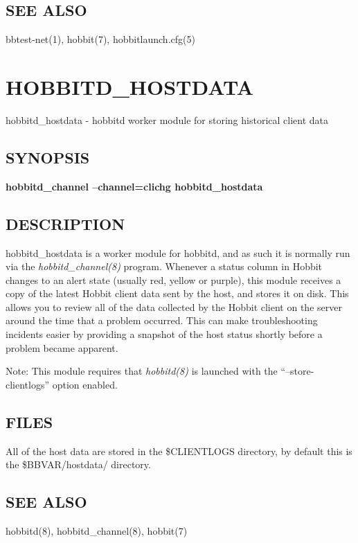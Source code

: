 \subsection{SEE ALSO}
bbtest-net(1), hobbit(7), hobbitlaunch.cfg(5) 

 
  
%
%

\newpage
\section{HOBBITD\_HOSTDATA}

 hobbitd\_hostdata - hobbitd worker module for storing historical
 client data 
\subsection{SYNOPSIS}
\textbf{hobbitd\_channel --channel=clichg hobbitd\_hostdata}


 
\subsection{DESCRIPTION}
 hobbitd\_hostdata is a worker module for hobbitd, and as such it is normally run via the \emph{hobbitd\_channel(8)}
 program. Whenever a status column in Hobbit changes to an alert state (usually red, yellow or purple), this module receives a copy of the latest Hobbit client data sent by the host, and stores it on disk. This allows you to review all of the data collected by the Hobbit client on the server around the time that a problem occurred. This can make troubleshooting incidents easier by providing a snapshot of the host status shortly before a problem became apparent. 

  Note: This module requires that \emph{hobbitd(8)}
 is launched with the ``--store-clientlogs'' option enabled. 


 
\subsection{FILES}
 All of the host data are stored in the \$CLIENTLOGS directory, by default this is the \$BBVAR/hostdata/ directory. 

 
\subsection{SEE ALSO}
hobbitd(8), hobbitd\_channel(8), hobbit(7) 

